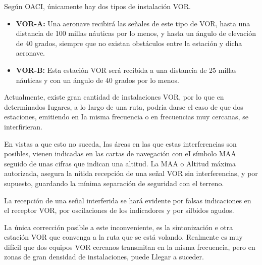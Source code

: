 Según OACI, únicamente hay dos tipos de instalación VOR. 

\begin{itemize}
\item \textbf{VOR-A:} Una aeronave recibirá las señales de este tipo de VOR, hasta una distancia de 100 millas náuticas por lo menos, y hasta un ángulo de elevación de 40 grados, siempre que no existan obstáculos entre la estación y dicha aeronave.

\item \textbf{VOR-B:} Esta estación VOR será recibida a una distancia de 25 millas náuticas y con un ángulo de 40 grados por lo menos.

\end{itemize}

Actualmente, existe gran cantidad de instalaciones VOR, por lo que en determinados Iugares, a lo Iargo de una ruta, podría darse el caso de que dos estaciones, emitiendo en Ia misma frecuencia o en frecuencias muy cercanas, se interfirieran. 

En vistas a que esto no suceda, Ias áreas en las que estas interferencias son posibles, vienen indicadas en las cartas de navegación con eI símbo­lo MAA seguido de unas cifras que indican una altitud. La MAA o Altitud máxima autorizada, asegura la nítida recepción de una señal VOR  sin interferencias, y por supuesto, guardando la mínima separación de seguridad con el terreno.

La recepción de una señal interferida se hará evidente por falsas indicaciones en el receptor VOR, por oscilaciones de los indicadores y por silbidos agudos.

La única corrección posible a este inconveniente, es la sintonización e otra estación VOR que convenga a la ruta que se está volando. Realmente es muy difícil que dos equipos VOR cercanos transmitan en la misma frecuencia, pero en zonas de gran densidad de instalaciones, puede Llegar a suceder.

